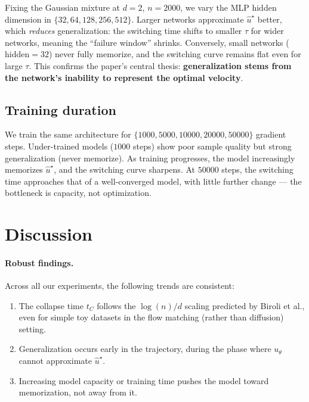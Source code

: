 \documentclass[10pt,a4paper]{article}
\theoremstyle{definition}
\begin{document}
Fixing the Gaussian mixture at $d = 2$, $n = 2000$, we vary the MLP hidden dimension in $\{32, 64, 128, 256, 512\}$.
Larger networks approximate $\hat{u}^\star$ better, which \emph{reduces} generalization: the switching time shifts to smaller $\tau$ for wider networks, meaning the ``failure window'' shrinks.
Conversely, small networks ($\mathrm{hidden} = 32$) never fully memorize, and the switching curve remains flat even for large $\tau$.
This confirms the paper's central thesis: \textbf{generalization stems from the network's inability to represent the optimal velocity}.

\subsection{Training duration}

We train the same architecture for $\{1000, 5000, 10000, 20000, 50000\}$ gradient steps.
Under-trained models ($1000$ steps) show poor sample quality but strong generalization (never memorize).
As training progresses, the model increasingly memorizes $\hat{u}^\star$, and the switching curve sharpens.
At $50000$ steps, the switching time approaches that of a well-converged model, with little further change --- the bottleneck is capacity, not optimization.

\section{Discussion}\label{sec:discussion}

\paragraph{Robust findings.}
Across all our experiments, the following trends are consistent:
\begin{enumerate}[nosep,leftmargin=1.5em]
    \item The collapse time $t_C$ follows the $\log(n)/d$ scaling predicted by Biroli et al., even for simple toy datasets in the flow matching (rather than diffusion) setting.
    \item Generalization occurs early in the trajectory, during the phase where $u_\theta$ cannot approximate $\hat{u}^\star$.
    \item Increasing model capacity or training time pushes the model toward memorization, not away from it.
\end{enumerate}
\end{document}
